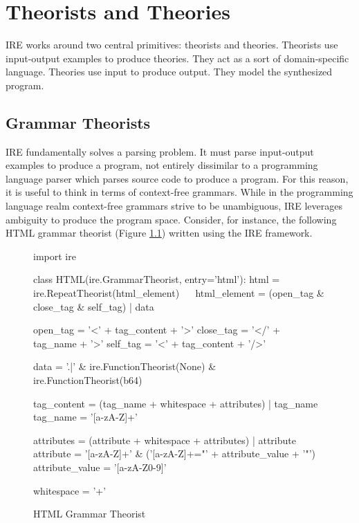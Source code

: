 \chapter{Theorists and Theories}

IRE works around two central primitives: theorists and theories.
Theorists use input-output examples to produce theories.
They act as a sort of domain-specific language.
Theories use input to produce output.
They model the synthesized program.



\section{Grammar Theorists}

IRE fundamentally solves a parsing problem.
It must parse input-output examples to produce a program, not entirely dissimilar to a programming language parser which parses source code to produce a program.
For this reason, it is useful to think in terms of context-free grammars.
While in the programming language realm context-free grammars strive to be unambiguous, IRE leverages ambiguity to produce the program space.
Consider, for instance, the following HTML grammar theorist (Figure \ref{fig:html_grammar}) written using the IRE framework.

\begin{figure}[H]
\begin{pythoncode}
import ire

class HTML(ire.GrammarTheorist, entry='html'):
    html = ire.RepeatTheorist(html_element) ~$\label{html_theorist}$~
    html_element = (open_tag & close_tag & self_tag) | data ~$\label{html_element_theorist}$~

    open_tag = '<' + tag_content + '>'
    close_tag = '</' + tag_name + '>'
    self_tag = '<' + tag_content + '/>'

    data = '.|\n' & ire.FunctionTheorist(None) & ire.FunctionTheorist(b64) ~$\label{data_theorist}$~

    tag_content = (tag_name + whitespace + attributes) | tag_name
    tag_name = '[a-zA-Z]+'

    attributes = (attribute + whitespace + attributes) | attribute
    attribute = '[a-zA-Z]+' & ('[a-zA-Z]+="' + attribute_value + '"')
    attribute_value = '[a-zA-Z0-9]'

    whitespace = '\s+'
\end{pythoncode}
\caption{HTML Grammar Theorist}
\label{fig:html_grammar}
\end{figure}

